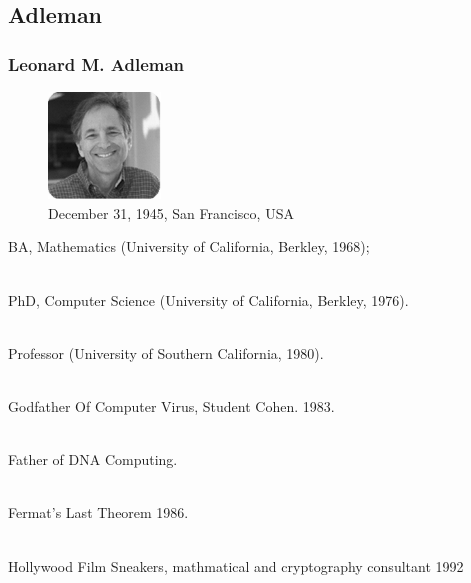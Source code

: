 \documentclass[slidestop,compress,mathserif]{beamer}
\begin{document}
\subsection{\hfill Adleman}
\begin{frame}
  \frametitle{Leonard M. Adleman}
  \begin{multicols}{2}
    \begin{figure}
      \includegraphics[width=3cm]{a.png}
      \caption{December 31, 1945, San Francisco, USA}
    \end{figure}
\footnotesize
    BA, Mathematics (University of California, Berkley, 1968);

    ~\\

    PhD, Computer Science (University of California, Berkley, 1976).

    ~\\

    Professor (University of Southern California, 1980).

    ~\\

    Godfather Of Computer Virus, Student Cohen. 1983.

    ~\\

    Father of DNA Computing. 

    ~\\

    Fermat's Last Theorem 1986.

    ~\\

    Hollywood Film Sneakers, mathmatical and cryptography consultant 1992 
    
  \end{multicols}

\end{frame}
\end{document}
